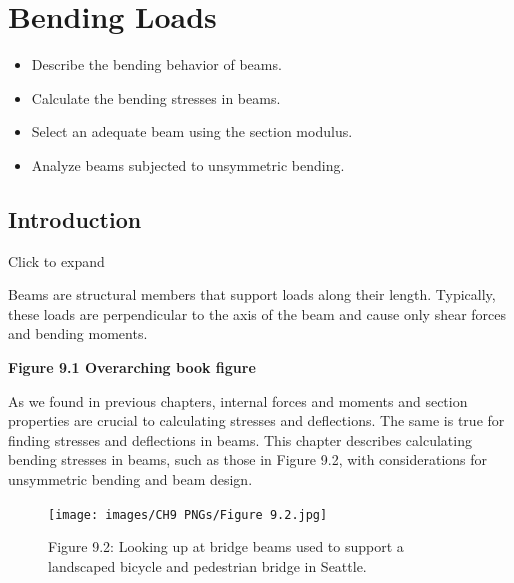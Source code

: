 \documentclass[
  letterpaper,
  DIV=11,
  numbers=noendperiod]{scrreprt}
\providecommand{\tightlist}{%
  \setlength{\itemsep}{0pt}\setlength{\parskip}{0pt}}\usepackage{longtable,booktabs,array}
\theoremstyle{definition}
\theoremstyle{remark}
\begin{document}

\chapter{Bending Loads}\label{sec-bending-loads}

\begin{tcolorbox}[enhanced jigsaw, leftrule=.75mm, colbacktitle=quarto-callout-note-color!10!white, breakable, opacityback=0, colback=white, titlerule=0mm, toprule=.15mm, colframe=quarto-callout-note-color-frame, coltitle=black, title={Learning Objectives}, toptitle=1mm, bottomrule=.15mm, rightrule=.15mm, left=2mm, arc=.35mm, opacitybacktitle=0.6, bottomtitle=1mm]

\begin{itemize}
\tightlist
\item
  Describe the bending behavior of beams.
\item
  Calculate the bending stresses in beams.
\item
  Select an adequate beam using the section modulus.
\item
  Analyze beams subjected to unsymmetric bending.
\end{itemize}

\end{tcolorbox}

\section*{Introduction}\label{introduction-8}


Click to expand

Beams are structural members that support loads along their length.
Typically, these loads are perpendicular to the axis of the beam and
cause only shear forces and bending moments.

\textbf{Figure 9.1 Overarching book figure} \,

As we found in previous chapters, internal forces and moments and
section properties are crucial to calculating stresses and deflections.
The same is true for finding stresses and deflections in beams. This
chapter describes calculating bending stresses in beams, such as those
in Figure 9.2, with considerations for unsymmetric bending and beam
design.

\begin{figure}[H]

{\centering \texttt{[image: images/CH9 PNGs/Figure 9.2.jpg]}

}

\caption{Figure 9.2: Looking up at bridge beams used to support a
landscaped bicycle and pedestrian bridge in Seattle.}

\end{figure}%
\end{document}
